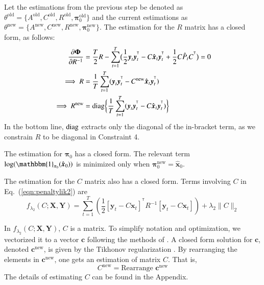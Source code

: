 \documentclass[times,twocolumn,final,authoryear]{elsarticle}
\providecommand{\mb}[1]{\boldsymbol{#1}}
\newcommand{\bx}{\mb{x}}
\newcommand{\by}{\mb{y}}
\newcommand{\bX}{\mb{X}}
\newcommand{\bY}{\mb{Y}}
\newcommand{\T}{^{\ensuremath{\mathsf{T}}}}           %
\newcommand{\diag}{\operatornamewithlimits{diag}}
\let\oldref\ref
\renewcommand{\ref}[1]{(\oldref{#1})}
\begin{document}
Let the estimations from the previous step be denoted as $\theta^{\text{old}} =\{A^{\text{old}},C^{\text{old}},R^{\text{old}},\mathbf{\pi}_0^{\text{old}}\}$ and the current estimations as $\theta^{\text{new}} =\{A^{\text{new}},C^{\text{new}},R^{\text{new}},\mathbf{\pi}_0^{\text{new}}\}$. The estimation for the $R$ matrix has a closed form, as follows:
\begin{equation}\label{eq:updateR}
\begin{aligned}
\frac{\partial \mathbf{\Phi}}{\partial R^{-1}} &= \frac{T}{2}R - \sum\limits_{t=1}^T\bigl(\frac{1}{2}\by_t\by_t^{\T} - C\hat{\bx}_t\by_t^{\T}+\frac{1}{2}C\hat{P}_tC^{\T}\bigr) =0 \\
\implies R &= \frac{1}{T}\sum\limits_{t=1}^{T}(\by_t\by_t^{\T}-C^{\text{new}}\hat{\bx}_t\by_t^{\T})\\
\implies R^{\text{new}} &= \diag \biggl\{\frac{1}{T}\sum\limits_{t=1}^{T}(\by_t\by_t^{\T}-C\hat{\bx}_t\by_t^{\T})\biggr\}
\end{aligned}
\end{equation}
In the bottom line, $\diag$ extracts only the diagonal of the in-bracket term, as we constrain $R$ to be diagonal in Constraint 4.

The estimation for $\mathbf{\pi}_0$ has a closed form. The relevant term $\log(\mathbbm{1}_{\mathbf{\pi}_0}(\hat{\bx}_0))$ is minimized only when $\mathbf{\pi}_0^{\text{new}} = \hat{\bx}_0$.

The estimation for the $C$ matrix also has a closed form. Terms involving $C$ in Eq.~\ref{eqn:penaltylik2} are
\begin{equation*}
f_{\lambda_2}(C;\bX,\bY) = \sum\limits_{t=1}^{T}\left(\frac{1}{2}[\by_t-C\bx_t]^{\T}R^{-1}[\by_t-C\bx_t]\right)+\lambda_2 \|C\|_2
\end{equation*}

In $f_{\lambda_2}(C;\bX,\bY)$, $C$ is a matrix. To simplify notation and optimization, we vectorized it to a vector $\mathbf{c}$ following the methods of \citet{turlach2005simultaneous}. A closed form solution for $\mathbf{c}$, denoted $\mathbf{c}^{\text{new}}$, is given by the Tikhonov regularization \citep{tikhonov1943stability}. By rearranging the elements in $\mathbf{c}^{\text{new}}$, one gets an estimation of matrix $C$. That is,
\begin{equation}\label{eq:updatec}
C^{\text{new}} =\text{Rearrange } \mathbf{c}^{\text{new}}
\end{equation}
The details of estimating $C$ can be found in the Appendix.
\end{document}
